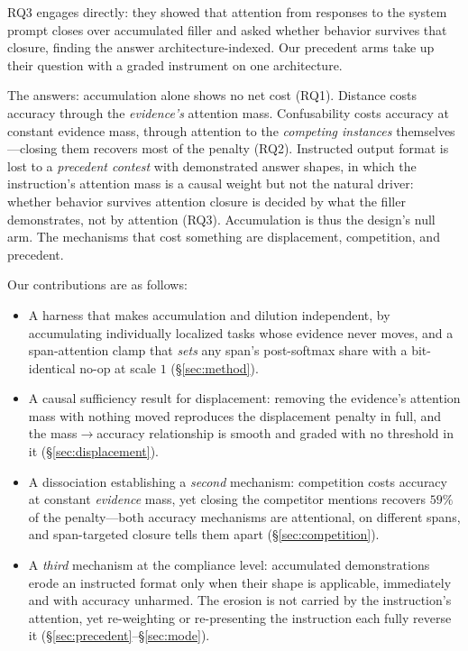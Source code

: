 \documentclass{article}
\begin{document}
RQ3 engages \citet{dongre2026attentioncloses} directly: they showed that attention from
responses to the system prompt closes over accumulated filler and asked whether behavior
survives that closure, finding the answer architecture-indexed. Our precedent arms take up
their question with a graded instrument on one architecture.

The answers: accumulation alone shows no net cost (RQ1). Distance costs accuracy through the
\emph{evidence's} attention mass. Confusability costs accuracy at constant evidence mass,
through attention to the \emph{competing instances} themselves---closing them recovers most of
the penalty (RQ2). Instructed output format is lost to a \emph{precedent contest} with
demonstrated answer shapes, in which the instruction's attention mass is a causal weight but not
the natural driver: whether behavior survives attention closure is decided by what the filler
demonstrates, not by attention (RQ3). Accumulation is thus the design's null arm. The
mechanisms that cost something are displacement, competition, and precedent.

Our contributions are as follows:

\begin{itemize}
  \item A harness that makes accumulation and dilution independent, by accumulating individually
        localized tasks whose evidence never moves, and a span-attention clamp that \emph{sets}
        any span's post-softmax share with a bit-identical no-op at scale $1$
        (\S\ref{sec:method}).
  \item A causal sufficiency result for displacement: removing the evidence's attention mass with
        nothing moved reproduces the displacement penalty in full, and the mass$\to$accuracy
        relationship is smooth and graded with no threshold in it (\S\ref{sec:displacement}).
  \item A dissociation establishing a \emph{second} mechanism: competition costs accuracy at
        constant \emph{evidence} mass, yet closing the competitor mentions recovers $59\%$ of
        the penalty---both accuracy mechanisms are attentional, on different spans, and
        span-targeted closure tells them apart (\S\ref{sec:competition}).
  \item A \emph{third} mechanism at the compliance level: accumulated demonstrations erode an
        instructed format only when their shape is applicable, immediately and with accuracy
        unharmed. The erosion is not carried by the instruction's attention, yet re-weighting or re-presenting the
        instruction each fully reverse it (\S\ref{sec:precedent}--\S\ref{sec:mode}).
\end{itemize}
\end{document}
